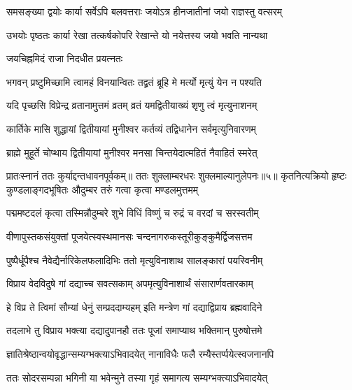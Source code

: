 \twolineshloka
{समसङ्ख्या द्वयोः कार्या सर्वेऽपि बलवत्तराः}
{जयोऽत्र हीनजातीनां जयो राज्ञस्तु वत्सरम्} %

\twolineshloka
{उभयोः पृष्ठतः कार्या रेखा तत्कर्षकोपरि}
{रेखान्ते यो नयेत्तस्य जयो भवति नान्यथा} %


\onelineshloka
{जयचिह्नमिदं राजा निदधीत प्रयत्नतः} %





\twolineshloka
{भगवन् प्रष्टुमिच्छामि त्वामहं विनयान्वितः}
{तद्व्रतं ब्रूहि मे मर्त्यो मृत्युं येन न पश्यति} %


\twolineshloka
{यदि पृच्छसि विप्रेन्द्र व्रतानामुत्तमं व्रतम्}
{व्रतं यमद्वितीयाख्यं शृणु त्वं मृत्युनाशनम्} %

\twolineshloka
{कार्तिके मासि शुद्धायां द्वितीयायां मुनीश्वर}
{कर्तव्यं तद्विधानेन सर्वमृत्युनिवारणम्} %

\twolineshloka
{ब्राह्मे मुहूर्ते चोप्थाय द्वितीयायां मुनीश्वर}
{मनसा चिन्तयेदात्महितं नैवाहितं स्मरेत्} %


प्रातःस्नानं ततः कुर्याद्दन्तधावनपूर्वकम्॥
ततः शुक्लाम्बरधरः शुक्लमाल्यानुलेपनः॥५॥
\twolineshloka
{कृतनित्यक्रियो हृष्टः कुण्डलाङ्गदभूषितः}
{औदुम्बर तरुं गत्वा कृत्वा मण्डलमुत्तमम्} %

\twolineshloka
{पद्ममष्टदलं कृत्वा तस्मिन्नौदुम्बरे शुभे}
{विधिं विष्णुं च रुद्रं च वरदां च सरस्वतीम्} %

\twolineshloka
{वीणापुस्तकसंयुक्तां पूजयेत्स्वस्थमानसः}
{चन्दनागरुकस्तूरीकुङ्कुमैर्द्विजसत्तम} %

\twolineshloka
{पुष्पैर्धूपैश्च नैवेद्यैर्नारिकेलफलादिभिः}
{ततो मृत्युविनाशाथ सालङ्कारां पयस्विनीम्} %

\twolineshloka
{विप्राय वेदविदुषे गां दद्याच्च सवत्सकाम्}
{अपमृत्युविनाशार्थं संसारार्णवतारकाम्} %

\twolineshloka
{हे विप्र ते त्विमां सौम्यां धेनुं सम्प्रददाम्यहम्}
{इति मन्त्रेण गां दद्याद्विप्राय ब्रह्मवादिने} %

\twolineshloka
{तदलाभे तु विप्राय भक्त्या दद्यादुपानहौ}
{ततः पूजां समाप्याथ भक्तिमान् पुरुषोत्तमे} %

\twolineshloka
{ज्ञातिश्रेष्ठान्वयोवृद्धान्सम्यग्भक्त्याऽभिवादयेत्}
{नानाविधैः फलै रम्यैस्तर्प्पयेत्स्वजनानपि} %

\twolineshloka
{ततः सोदरसम्पन्ना भगिनी या भवेन्मुने}
{तस्या गृहं समागत्य सम्यग्भक्त्याऽभिवादयेत्} %

